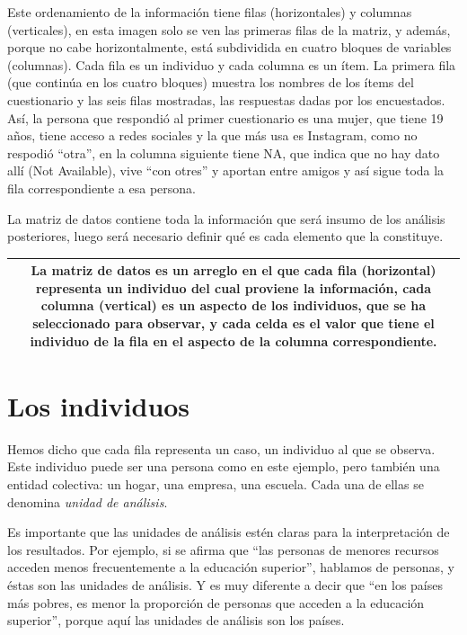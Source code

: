 \documentclass[]{book}
\begin{document}
Este ordenamiento de la información tiene filas (horizontales) y columnas (verticales), en esta imagen solo se ven las primeras filas de la matriz, y además, porque no cabe horizontalmente, está subdividida en cuatro bloques de variables (columnas). Cada fila es un individuo y cada columna es un ítem. La primera fila (que continúa en los cuatro bloques) muestra los nombres de los ítems del cuestionario y las seis filas mostradas, las respuestas dadas por los encuestados. Así, la persona que respondió al primer cuestionario es una mujer, que tiene 19 años, tiene acceso a redes sociales y la que más usa es Instagram, como no respodió ``otra'', en la columna siguiente tiene NA, que indica que no hay dato allí (Not Available), vive ``con otres'' y aportan entre amigos y así sigue toda la fila correspondiente a esa persona.

La matriz de datos contiene toda la información que será insumo de los análisis posteriores, luego será necesario definir qué es cada elemento que la constituye.

\begin{longtable}[]{@{}c@{}}
\toprule
\endhead
\begin{minipage}[t]{0.97\columnwidth}\centering
La matriz de datos es un arreglo en el que cada fila (horizontal) representa un individuo del cual proviene la información, cada columna (vertical) es un aspecto de los individuos, que se ha seleccionado para observar, y cada celda es el valor que tiene el individuo de la fila en el aspecto de la columna correspondiente.\strut
\end{minipage}\tabularnewline
\bottomrule
\end{longtable}

\hypertarget{los-individuos}{%
\section{Los individuos}\label{los-individuos}}

Hemos dicho que cada fila representa un caso, un individuo al que se observa. Este individuo puede ser una persona como en este ejemplo, pero también una entidad colectiva: un hogar, una empresa, una escuela. Cada una de ellas se denomina \emph{unidad de análisis}.

Es importante que las unidades de análisis estén claras para la interpretación de los resultados. Por ejemplo, si se afirma que ``las personas de menores recursos acceden menos frecuentemente a la educación superior'', hablamos de personas, y éstas son las unidades de análisis. Y es muy diferente a decir que ``en los países más pobres, es menor la proporción de personas que acceden a la educación superior'', porque aquí las unidades de análisis son los países.
\end{document}
